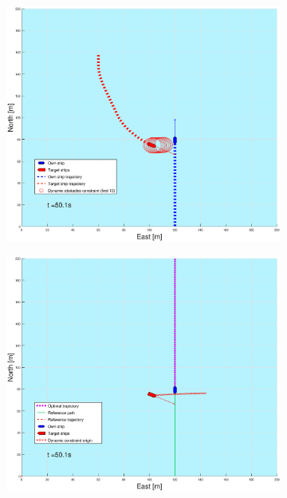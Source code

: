 \begin{figure}[ht!]
\begin{subfigure}[b]{0.499\textwidth}
    \end{subfigure}
    \hfill
    \\
    \begin{subfigure}[b]{0.49\textwidth}
        \centering
        \includegraphics[width=\textwidth]{Images/Figures/sving_SO/_Simple_0fig1_time=50}
    \end{subfigure}
    \hfill
    \begin{subfigure}[b]{0.499\textwidth}
        \centering
        \includegraphics[width=\textwidth]{Images/Figures/sving_SO/_Simple_0fig999_time=50}

\end{subfigure}
\end{figure}
